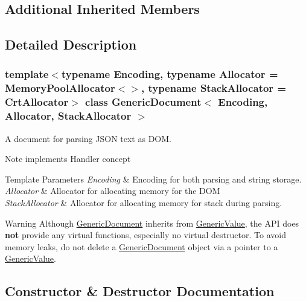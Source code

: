 \subsection*{Additional Inherited Members}


\subsection{Detailed Description}
\subsubsection*{template$<$typename Encoding, typename Allocator = Memory\+Pool\+Allocator$<$$>$, typename Stack\+Allocator = Crt\+Allocator$>$\newline
class Generic\+Document$<$ Encoding, Allocator, Stack\+Allocator $>$}

A document for parsing J\+S\+ON text as D\+OM. 

\begin{DoxyNote}{Note}
implements Handler concept 
\end{DoxyNote}

\begin{DoxyTemplParams}{Template Parameters}
{\em Encoding} & Encoding for both parsing and string storage. \\
\hline
{\em Allocator} & Allocator for allocating memory for the D\+OM \\
\hline
{\em Stack\+Allocator} & Allocator for allocating memory for stack during parsing. \\
\hline
\end{DoxyTemplParams}
\begin{DoxyWarning}{Warning}
Although \hyperlink{classGenericDocument}{Generic\+Document} inherits from \hyperlink{classGenericValue}{Generic\+Value}, the A\+PI does {\bfseries not} provide any virtual functions, especially no virtual destructor. To avoid memory leaks, do not {\ttfamily delete} a \hyperlink{classGenericDocument}{Generic\+Document} object via a pointer to a \hyperlink{classGenericValue}{Generic\+Value}. 
\end{DoxyWarning}


\subsection{Constructor \& Destructor Documentation}
\mbox{\label{classGenericDocument_a6b1c313ad538cafc4d23d4bd5f97178c}} 
